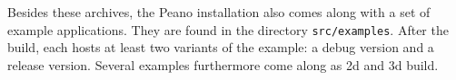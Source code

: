 Besides these archives, the Peano installation also comes along with a set of
example applications.
They are found in the directory \texttt{src/examples}.
After the build, each hosts at least two variants of the example: a debug
version and a release version.
Several examples furthermore come along as 2d and 3d build.




% 
